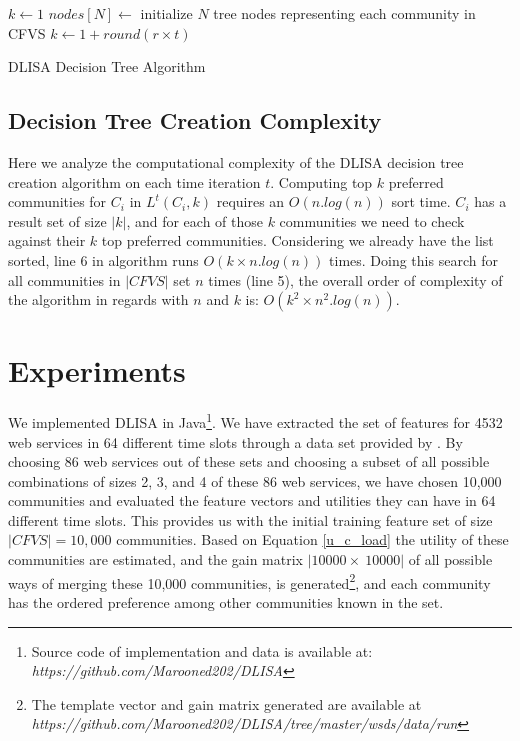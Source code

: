 \documentclass[10pt,journal,cspaper,compsoc]{IEEEtran}
\begin{document}
\begin{algorithm}
\DontPrintSemicolon
{}
$k \gets 1$\;
$nodes[N] \gets$ initialize $N$ tree nodes representing each community in CFVS\;
 {
	$k \gets 1 + round (r \times t)$\;
   {
	   {
		}
  }
}
\;
\caption{{\sc DLISA Decision Tree Algorithm}}
\label{algo:dectree}
\end{algorithm}

\subsection{Decision Tree Creation Complexity}\label{ss:complexity}
Here we analyze the computational complexity of the DLISA decision tree creation algorithm on each time iteration $t$. Computing top $k$ preferred communities for $C_i$ in $L^t(C_i, k)$ requires an $O(n.log(n))$ sort time. $C_i$ has a result set of size $|k|$, and for each of those $k$ communities we need to check against their $k$ top preferred communities. Considering we already have the list sorted, line 6 in algorithm runs $O(k \times n.log(n))$ times. Doing this search for all communities in $|CFVS|$ set $n$ times (line 5), the overall order of complexity of the algorithm in regards with $n$ and $k$ is: $O(k^2 \times n^2.log(n))$.

\section{Experiments}\label{s:experiments}
We implemented DLISA in Java\footnote{Source code of implementation and data is available at: \emph{https://github.com/Marooned202/DLISA}}. We have extracted the set of features for 4532 web services in 64 different time slots through a data set provided by \cite{10.1109/ISSRE.2011.17}. By choosing 86 web services out of these sets and choosing a subset of all possible combinations of sizes 2, 3, and 4 of these 86 web services, we have chosen 10,000 communities and evaluated the feature vectors and utilities they can have in 64 different time slots. This provides us with the initial training feature set of size $|CFVS| = 10,000$ communities. Based on Equation \ref{u_c_load} the utility of these communities are estimated, and the gain matrix $|10000 \times~ 10000|$ of all possible ways of merging these 10,000 communities, is generated\footnote {The template vector and gain matrix generated are available at \emph{https://github.com/Marooned202/DLISA/tree/master/wsds/data/run}}, and each community has the ordered preference among other communities known in the set. 
\end{document}
